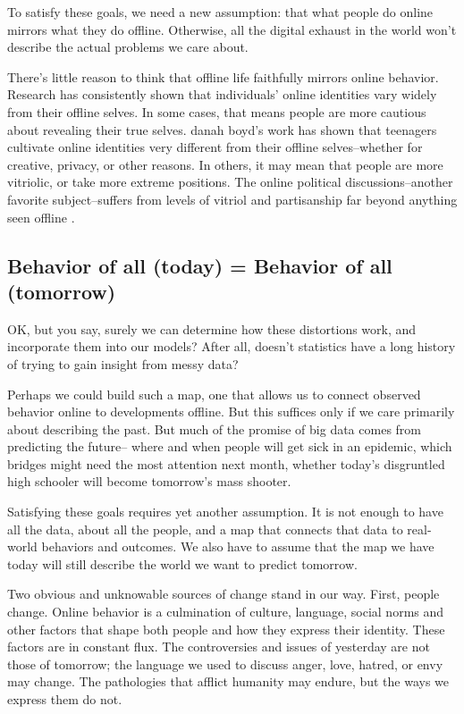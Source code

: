 \documentclass[12pt]{article}
\begin{document}
To satisfy these goals, we need a new assumption: that what
people do online mirrors what they do offline. Otherwise, all the
digital exhaust in the world won't describe the actual problems we
care about.

There's little reason to think that offline life faithfully mirrors
online behavior. Research has consistently shown that individuals'
online identities vary widely from their offline selves. In some
cases, that means people are more cautious about revealing their true
selves. danah boyd's work \citep{boyd2011social} has
shown that teenagers cultivate online identities very different from
their offline selves--whether for creative, privacy, or other
reasons. In others, it may mean that people are more vitriolic, or take
more extreme positions. The online political discussions--another favorite
subject--suffers from levels of vitriol and partisanship far beyond
anything seen offline \citep{conover2011}. 


\subsection{Behavior of all (today) = Behavior of all (tomorrow)}
\label{sec:behave-today-tomorrow}

OK, but you say, surely we can determine how these distortions work,
and incorporate them into our models? After all, doesn't statistics
have a long history of trying to gain insight from messy data?

Perhaps we could build such a map, one that allows us to connect
observed behavior online to developments offline. But this suffices
only if we care primarily about describing the past. But much of the
promise of big data comes from predicting the future-- where and when
people will get sick in an epidemic, which bridges might need the most
attention next month, whether today's disgruntled high schooler will
become tomorrow's mass shooter.

Satisfying these goals requires yet another assumption. It is not
enough to have all the data, about all the people, and a map that
connects that data to real-world behaviors and outcomes. We also
have to assume that the map we have today will still describe the
world we want to predict tomorrow.

Two obvious and unknowable sources of change stand in our way. First,
people change. Online behavior is a culmination of culture, language,
social norms and other factors that shape both people and how they
express their identity. These factors are in constant flux. The
controversies and issues of yesterday are not those of tomorrow; the
language we used to discuss anger, love, hatred, or envy may change.
The pathologies that afflict humanity may endure, but the ways we
express them do not. 
\end{document}
